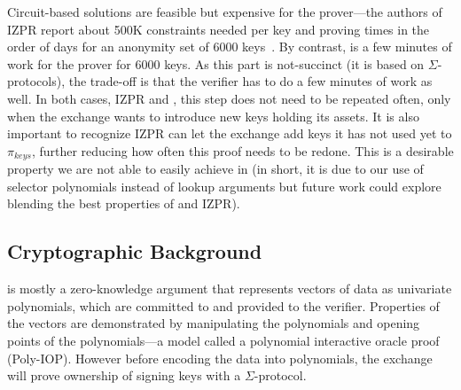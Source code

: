 Circuit-based solutions are feasible but expensive for the prover---the authors of IZPR report about 500K constraints needed per key and proving times in the order of days for an anonymity set of 6000 keys~\cite{izpr}. By contrast, \Sys is a few minutes of work for the prover for 6000 keys. As this part is not-succinct (it is based on $\Sigma$-protocols), the trade-off is that the verifier has to do a few minutes of work as well. In both cases, IZPR and \Sys, this step does not need to be repeated often, only when the exchange wants to introduce new keys holding its assets. It is also important to recognize IZPR can let the exchange add keys it has not used yet to $\pi_{keys}$, further reducing how often this proof needs to be redone. This is a desirable property we are not able to easily achieve in \Sys (in short, it is due to our  use of selector polynomials instead of lookup arguments but future work could explore blending the best properties of \Sys and IZPR). 


\subsection{Cryptographic Background}

\Sys is mostly a zero-knowledge argument that represents vectors of data as univariate polynomials, which are committed to and provided to the verifier. Properties of the vectors are demonstrated by manipulating the polynomials and opening points of the polynomials---a model called a polynomial interactive oracle proof (Poly-IOP). However before encoding the data into polynomials, the exchange will prove ownership of signing keys with a $\Sigma$-protocol.

